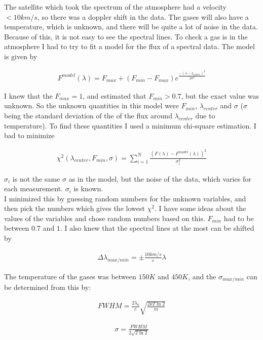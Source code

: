 \documentclass[a4paper, 10pt]{article}
\begin{document}
The satellite which took the spectrum of the atmosphere had a velocity $< 10 km/s$, so there was a doppler shift in the data. The gases will also have a temperature, which is unknown, and there will be quite a lot of noise in the data. Because of this, it is not easy to see the spectral lines. To check a gas is in the atmosphere I had to try to fit a model for the flux of a spectral data. The model is given by \cite{1d}

\begin{align}
F^{model}(\lambda) = F_{max} +(F_{min} - F_{max})e^{\frac{-(\lambda - \lambda_{center})^2}{2\sigma^2}}
\end{align}

I knew that the $F_{max} = 1$, and estimated that $F_{min}>0.7$, but the exact value was unknown. So the unknown quantities in this model were $F_{min}$, $\lambda_{center}$ and $\sigma$ ($\sigma$ being the standard deviation of the of the flux around $\lambda_{center}$ due to temperature). To find these quantities I used a minimum chi-square estimation. I bad to minimize

\begin{align}
\chi^2(\lambda_{center},F_{min},\sigma) = \sum_{i = 1}^N \frac{(F(\lambda) - F^{model}(\lambda))^2}{\sigma_i^2}
\end{align}

$\sigma_i$ is not the same $\sigma$ as in the model, but the noise of the data, which varies for each measurement. $\sigma_i$ is known.\\

I minimized this by guessing random numbers for the unknown variables, and then pick the numbers which gives the lowest $\chi^2$. I have some ideas about the values of the variables and chose random numbers based on this. $F_{min}$ had to be between $0.7$ and $1$. I also knew that the spectral lines at the most can be shifted by

\begin{align}
\Delta \lambda_{max/min} = \pm \frac{10 km/s}{c} \lambda
\end{align}

The temperature of the gases was between $150K$ and $450K$, and the $\sigma_{max/min}$ can be determined from this by:

\begin{align}
FWHM = \frac{2 \lambda_0}{c}\sqrt{\frac{2kT \ln 2}{m}}
\end{align}

\begin{align}
\sigma = \frac{FWHM}{2\sqrt{2 \ln 2}}
\end{align}
\end{document}
